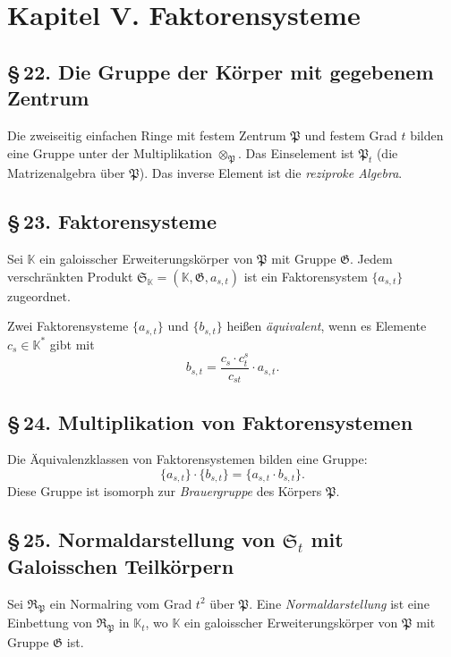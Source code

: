 \documentclass[10pt,a4paper]{article}
\theoremstyle{plain}
\theoremstyle{definition}
\theoremstyle{remark}
\newcommand{\KK}{\mathbb{K}}
\newcommand{\tensor}{\otimes}\newcommand{\Tensor}{\bigotimes}
\begin{document}
\newpage
\section*{Kapitel V. Faktorensysteme}

\subsection*{\S\,22. Die Gruppe der K\"orper mit gegebenem Zentrum}

Die zweiseitig einfachen Ringe mit festem Zentrum $\mathfrak{P}$ und festem Grad $t$ bilden eine Gruppe unter der Multiplikation $\tensor_\mathfrak{P}$. Das Einselement ist $\mathfrak{P}_t$ (die Matrizenalgebra \"uber $\mathfrak{P}$). Das inverse Element ist die \emph{reziproke Algebra}.

\subsection*{\S\,23. Faktorensysteme}

Sei $\KK$ ein galoisscher Erweiterungsk\"orper von $\mathfrak{P}$ mit Gruppe $\mathfrak{G}$. Jedem verschr\"ankten Produkt $\mathfrak{S}_\KK = (\KK, \mathfrak{G}, a_{s,t})$ ist ein Faktorensystem $\{a_{s,t}\}$ zugeordnet.

Zwei Faktorensysteme $\{a_{s,t}\}$ und $\{b_{s,t}\}$ hei\ss en \emph{\"aquivalent}, wenn es Elemente $c_s \in \KK^*$ gibt mit
\[
b_{s,t} = \frac{c_s \cdot c_t^s}{c_{st}} \cdot a_{s,t}.
\]

\subsection*{\S\,24. Multiplikation von Faktorensystemen}

Die \"Aquivalenzklassen von Faktorensystemen bilden eine Gruppe:
\[
\{a_{s,t}\} \cdot \{b_{s,t}\} = \{a_{s,t} \cdot b_{s,t}\}.
\]
Diese Gruppe ist isomorph zur \emph{Brauergruppe} des K\"orpers $\mathfrak{P}$.

\subsection*{\S\,25. Normaldarstellung von $\mathfrak{S}_t$ mit Galoisschen Teilk\"orpern}

Sei $\mathfrak{R}_\mathfrak{P}$ ein Normalring vom Grad $t^2$ \"uber $\mathfrak{P}$. Eine \emph{Normaldarstellung} ist eine Einbettung von $\mathfrak{R}_\mathfrak{P}$ in $\KK_t$, wo $\KK$ ein galoisscher Erweiterungsk\"orper von $\mathfrak{P}$ mit Gruppe $\mathfrak{G}$ ist.
\end{document}
